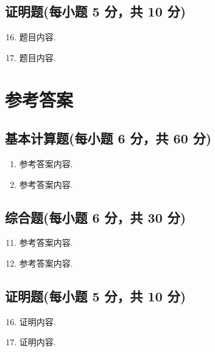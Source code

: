 \documentclass[../main.tex]{subfiles}
\begin{document}
\section{证明题(每小题 5 分，共 10 分)}
\begin{enumerate}
  \setcounter{enumi}{15}
  \item 题目内容.
    \qblank{10em}

  \item 题目内容.
    \qblank{10em}
\end{enumerate}

\chapter{\ExamTitle 参考答案}

\section{基本计算题(每小题 6 分，共 60 分)}
\begin{enumerate}
  \item \sol 参考答案内容.

  \item \sol 参考答案内容.
\end{enumerate}

\section{综合题(每小题 6 分，共 30 分)}
\begin{enumerate}
  \setcounter{enumi}{10}
  \item \sol 参考答案内容.

  \item \sol 参考答案内容.
\end{enumerate}

\section{证明题(每小题 5 分，共 10 分)}
\begin{enumerate}
  \setcounter{enumi}{15}
  \item \prf 证明内容.

  \item \prf 证明内容.
\end{enumerate}
\end{document}
